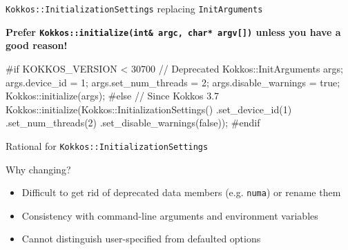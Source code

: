 
\begin{frame}[fragile]{\texttt{Kokkos::InitializationSettings} replacing \texttt{InitArguments}}

\textbf{Prefer \texttt{Kokkos::initialize(int\& argc, char* argv[])} unless you have a good reason!}

\begin{code}[keywords={InitializationSettings,InitArguments}]
#if KOKKOS_VERSION < 30700
// Deprecated
Kokkos::InitArguments args;
args.device_id = 1;
args.set_num_threads = 2;
args.disable_warnings = true;
Kokkos::initialize(args);
#else
// Since Kokkos 3.7
Kokkos::initialize(Kokkos::InitializationSettings()
                       .set_device_id(1)
                       .set_num_threads(2)
                       .set_disable_warnings(false));
#endif
\end{code}

\end{frame}


\begin{frame}[fragile]{Rational for \texttt{Kokkos::InitializationSettings}}

Why changing?
\begin{itemize}
\item Difficult to get rid of deprecated data members (e.g. \texttt{numa}) or rename them
\item Consistency with command-line arguments and environment variables
\item Cannot distinguish user-specified from defaulted options
\end{itemize}

\end{frame}


